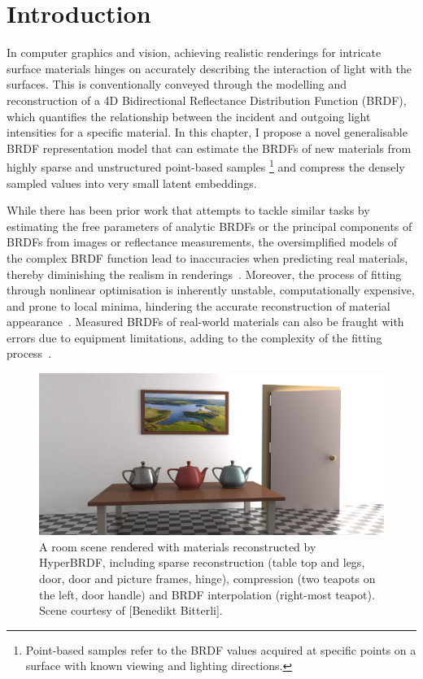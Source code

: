 \section{Introduction}
\label{sec:intro}


In computer graphics and vision, achieving realistic renderings for intricate surface materials hinges on accurately describing the interaction of light with the surfaces. This is conventionally conveyed through the modelling and reconstruction of a 4D Bidirectional Reflectance Distribution Function (BRDF), which quantifies the relationship between the incident and outgoing light intensities for a specific material. In this chapter, I propose a novel generalisable \gls{BRDF} representation model that can estimate the \gls{BRDF}s of new materials from highly sparse and unstructured point-based samples \footnote{Point-based samples refer to the \gls{BRDF} values acquired at specific points on a surface with known viewing and lighting directions.} and compress the densely sampled values into very small latent embeddings.


While there has been prior work that attempts to tackle similar tasks by estimating the free parameters of analytic \gls{BRDF}s or the principal components of \gls{BRDF}s from images or reflectance measurements, the oversimplified models of the complex \gls{BRDF} function lead to inaccuracies when predicting real materials, thereby diminishing the realism in renderings~\cite{ngan2005}. Moreover, the process of fitting through nonlinear optimisation is inherently unstable, computationally expensive, and prone to local minima, hindering the accurate reconstruction of material appearance~\cite{dupuy2015, guarnera2016}. Measured \gls{BRDF}s of real-world materials can also be fraught with errors due to equipment limitations, adding to the complexity of the fitting process~\cite{nielsen2015optimal}. 

\begin{figure}
  \centering
   \includegraphics[width=\linewidth]{Chapters/hyperbrdf-figs/teaser_cropped.png}
   \caption{A room scene rendered with materials reconstructed by HyperBRDF, including sparse reconstruction (table top and legs, door, door and picture frames, hinge), compression (two teapots on the left, door handle) and \gls{BRDF} interpolation (right-most teapot). Scene courtesy of [Benedikt Bitterli].}
   \label{fig:teaser}
\end{figure}

